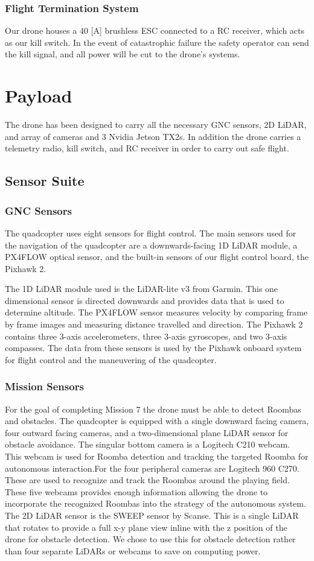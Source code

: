 \documentclass[12pt,letterpaper]{article}
\begin{document}
		\subsubsection*{Flight Termination System}
			Our drone houses a 40 [A] brushless ESC connected to a RC receiver, which acts as our kill switch. In the event of catastrophic failure the safety operator can send the kill signal, and all power will be cut to the drone's systems.


\section*{Payload}
	The drone has been designed to carry all the necessary GNC sensors, 2D LiDAR, and array of cameras and 3 Nvidia Jetson TX2s. In addition the drone carries a telemetry radio, kill switch, and RC receiver in order to carry out safe flight.
	\subsection*{Sensor Suite}
		\subsubsection*{GNC Sensors}
			The quadcopter uses eight sensors for flight control. The main sensors used for the navigation of the quadcopter are a downwards-facing 1D LiDAR module, a PX4FLOW optical sensor, and the built-in sensors of our flight control board, the Pixhawk 2.

			The 1D LiDAR module used is the LiDAR-lite v3 from Garmin. This one dimensional sensor is directed downwards and provides data that is used to determine altitude. The PX4FLOW sensor measures velocity by comparing frame by frame images and measuring distance travelled and direction. The Pixhawk 2 contains three 3-axis accelerometers, three 3-axis gyroscopes, and two 3-axis compasses. The data from these sensors is used by the Pixhawk onboard system for flight control and the maneuvering of the quadcopter.

		\subsubsection*{Mission Sensors}
			For the goal of completing Mission 7 the drone must be able to detect Roombas and obstacles. The quadcopter is equipped with a single downward facing camera, four outward facing cameras, and a two-dimensional plane LiDAR sensor for obstacle avoidance.
			The singular bottom camera is a Logitech C210 webcam. This webcam is used for Roomba detection and tracking the targeted Roomba for autonomous interaction.For the four peripheral cameras are Logitech 960 C270. These are used to recognize and track the Roombas around the playing field. These five webcams provides enough information allowing the drone to incorporate the recognized Roombas into the strategy of the autonomous system.
			The 2D LiDAR sensor is the SWEEP sensor by Scanse. This is a single LiDAR that rotates to provide a full x-y plane view inline with the z position of the drone for obstacle detection. We chose to use this for obstacle detection rather than four separate LiDARs or webcams to save on computing power.
\end{document}
